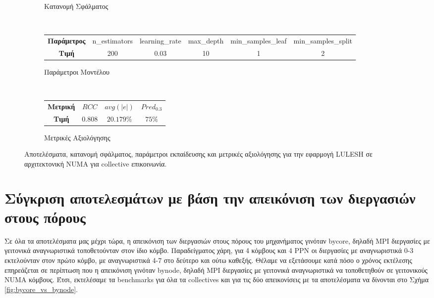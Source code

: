 \begin{figure}[H]
\begin{subfigure}[b]{0.47\textwidth}
        \caption{Κατανομή Σφάλματος}
    \end{subfigure} 
    \\[0.2cm]
    \begin{subfigure}[b]{\textwidth}
   	 	\scriptsize
		\begin{tabular}{c||c|c|c|c|c}
			\textbf{Παράμετρος} & n\_estimators & learning\_rate & max\_depth & min\_samples\_leaf & min\_samples\_split \\
			\textbf{Τιμή}       &       200        &  0.03               & 10          &  1                  &    2
		\end{tabular}
		\caption{Παράμετροι Μοντέλου}
    \end{subfigure}
    \\[0.2cm]
    \begin{subfigure}[b]{\textwidth}
    		\centering
   	 	\scriptsize
		\begin{tabular}{c||c|c|c}
			\textbf{Μετρική} & $RCC$ &   $avg(|e|)$ & $Pred_{0.3}$  \\
			\textbf{Τιμή}  &  $0.808$   &      $20.179\%
			$        &  $75\%$                                         
		\end{tabular}
		\caption{Μετρικές Αξιολόγησης}
    \end{subfigure}
            \caption{Αποτελέσματα, κατανομή σφάλματος, παράμετροι εκπαίδευσης και μετρικές αξιολόγησης για την εφαρμογή LULESH σε αρχιτεκτονική NUMA για collective επικοινωνία. }
    \label{fig:coll_NUMA}
\end{figure}
\section{Σύγκριση αποτελεσμάτων με βάση την απεικόνιση των διεργασιών στους πόρους}
Σε όλα τα αποτελέσματα μας μέχρι τώρα, η απεικόνιση των διεργασιών στους πόρους του μηχανήματος γινόταν bycore, δηλαδή MPI διεργασίες με γειτονικά αναγνωριστικά τοποθετούνταν στον ίδιο κόμβο. Παραδείγματος χάρη, για 4 κόμβους και 4 PPN οι διεργασίες με αναγνωριστικά 0-3 εκτελούνταν στον πρώτο κόμβο, με αναγνωριστικά 4-7 στο δεύτερο και ούτω καθεξής. Θέλαμε να εξετάσουμε κατά πόσο ο χρόνος εκτέλεσης επηρεάζεται σε περίπτωση που η απεικόνιση γινόταν bynode, δηλαδή MPI διεργασίες με γειτονικά αναγνωριστικά να τοποθετηθούν σε γειτονικούς NUMA κόμβους. Έτσι, εκτελέσαμε τα benchmarks για όλα τα collectives και για τις δύο απεικονίσεις με τα αποτελέσματα να δίνονται στο Σχήμα \ref{fig:bycore_vs_bynode}. 
